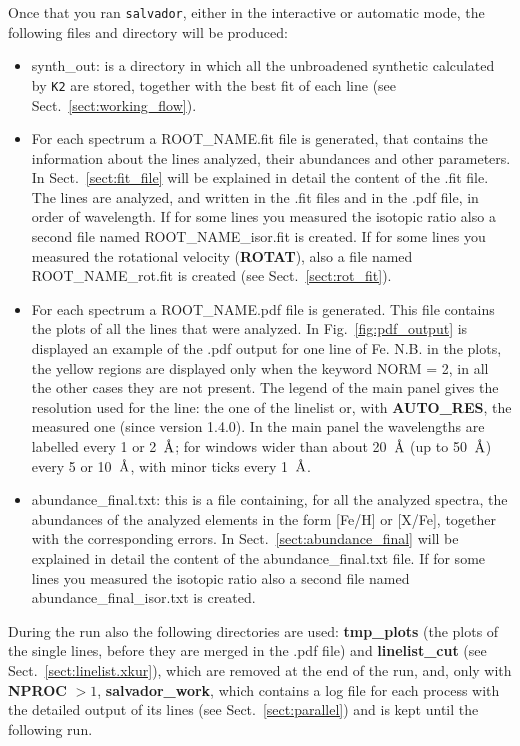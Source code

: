 \documentclass[modern]{aastex701}
\newcommand{\angstrom}{\mbox{\normalfont\AA}}
\begin{document}
Once that you ran \texttt{salvador}, either in the interactive or automatic mode, the following files and directory will be produced:
\begin{itemize}
    \item synth\_out: is a directory in which all the unbroadened synthetic calculated by \texttt{K2} are stored, together with the best fit of each line (see Sect.~\ref{sect:working_flow}). 
    \item For each spectrum a ROOT\_NAME.fit file is generated, that contains the information about the lines analyzed, their abundances and other parameters. In Sect.~\ref{sect:fit_file} will be explained in detail the content of the .fit file. The lines are analyzed, and written in the .fit files and in the .pdf file, in order of wavelength. If for some lines you measured the isotopic ratio also a second file named ROOT\_NAME\_isor.fit is created. If for some lines you measured the rotational velocity ({\bf ROTAT}), also a file named ROOT\_NAME\_rot.fit is created (see Sect.~\ref{sect:rot_fit}). 
    \item For each spectrum a ROOT\_NAME.pdf file is generated. This file contains the plots of all the lines that were analyzed. In Fig.~\ref{fig:pdf_output} is displayed an example of the .pdf output for one line of Fe. N.B. in the plots, the yellow regions are displayed only when the keyword NORM = 2, in all the other cases they are not present. The legend of the main panel gives the resolution used for the line: the one of the linelist or, with {\bf AUTO\_RES}, the measured one (since version 1.4.0). In the main panel the wavelengths are labelled every 1 or 2~$\angstrom$; for windows wider than about 20~$\angstrom$ (up to 50~$\angstrom$) every 5 or 10~$\angstrom$, with minor ticks every 1~$\angstrom$.
    \item abundance\_final.txt: this is a file containing, for all the analyzed spectra, the abundances of the analyzed elements in the form [Fe/H] or [X/Fe], together with the corresponding errors. In Sect.~\ref{sect:abundance_final} will be explained in detail the content of the abundance\_final.txt file. If for some lines you measured the isotopic ratio also a second file named abundance\_final\_isor.txt is created. 
\end{itemize}

During the run also the following directories are used: {\bf tmp\_plots} (the plots of the single lines, before they are merged in the .pdf file) and {\bf linelist\_cut} (see Sect.~\ref{sect:linelist.xkur}), which are removed at the end of the run, and, only with {\bf NPROC} $> 1$, {\bf salvador\_work}, which contains a log file for each process with the detailed output of its lines (see Sect.~\ref{sect:parallel}) and is kept until the following run.
\end{document}
